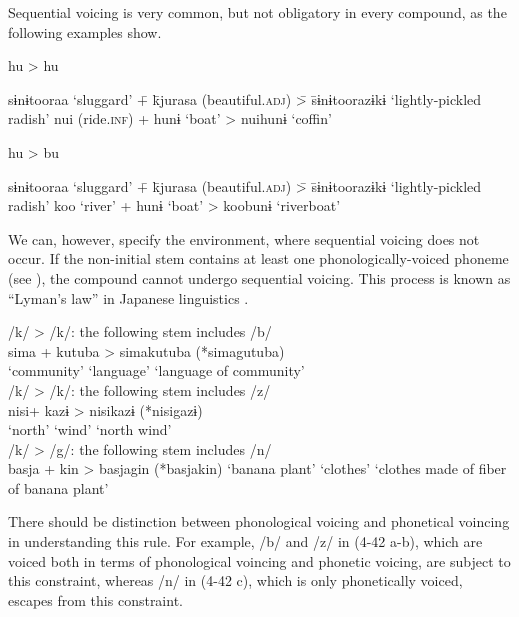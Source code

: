 Sequential voicing is very common, but not obligatory in every compound, as the following examples show.

\ea  \exi{}  hu > hu \label{ex:4.41}
    \begin{tabbing} sɨnɨtooraa ‘sluggard’ \= + \= kjurasa (beautiful.\textsc{adj}) \= > \= sɨnɨtoorazɨkɨ ‘lightly-pickled radish’\kill
    nui  (ride.\textsc{inf}) \> + \> hunɨ  ‘boat’ \> > \> nuihunɨ  ‘coffin’
    \end{tabbing}
     hu > bu
    \begin{tabbing} sɨnɨtooraa ‘sluggard’ \= + \= kjurasa (beautiful.\textsc{adj}) \= > \= sɨnɨtoorazɨkɨ ‘lightly-pickled radish’\kill
    koo  ‘river’  \> + \>  hunɨ  ‘boat’ \> > \> koobunɨ  ‘riverboat’
    \end{tabbing}
\z 

We can, however, specify the environment, where sequential voicing does not occur. If the non-initial stem contains at least one phonologically-voiced phoneme (see ), the compound cannot undergo sequential voicing. This process is known as “Lyman’s law” in Japanese linguistics \citep{Lyman1894}.

\ea \label{ex:4.42}
\ea /k/ > /k/: the following stem includes /b/ \label{ex:4.42a}\\
    \gll     sima   +  kutuba    >  {simakutuba  (*simagutuba)} \\
           ‘community’ {} ‘language’ {} ‘language of community’\\
\ex /k/ > /k/: the following stem includes /z/\\
    \gll  nisi\footnotemark   +  kazɨ    >  {nisikazɨ  (*nisigazɨ)}\\
      ‘north’     {}          ‘wind’   {}    {‘north wind’}\\
\ex  /k/ > /g/: the following stem includes /n/\\
    basja    +  kin    >  {basjagin  (*basjakin)}
     {‘banana plant’}   {} ‘clothes’  {}       {‘clothes made of fiber of banana plant’}
    \z
\z
{}

There should be distinction between phonological voicing and phonetical voincing in understanding this rule. For example, /b/ and /z/ in (4-42 a-b), which are voiced both in terms of phonological voincing and phonetic voicing, are subject to this constraint, whereas /n/ in (4-42 c), which is only phonetically voiced, escapes from this constraint.

